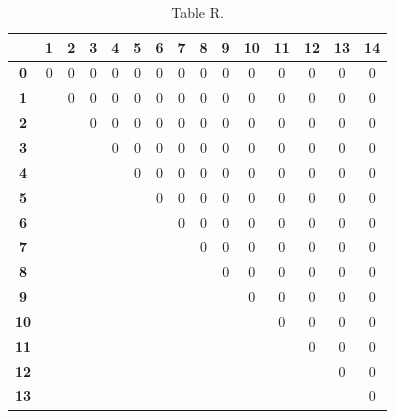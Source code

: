 \documentclass{article}
\begin{document}
\begin{table}[!ht]
\begin{adjustwidth}{-3cm}{-3cm}
\centering
\begin{tabular}{c||c|c|c|c|c|c|c|c|c|c|c|c|c|c|}
\cline{2-15}
 & \cellcolor{gray90}\textbf{1} & \cellcolor{gray90}\textbf{2} & \cellcolor{gray90}\textbf{3} & \cellcolor{gray90}\textbf{4} & \cellcolor{gray90}\textbf{5} & \cellcolor{gray90}\textbf{6} & \cellcolor{gray90}\textbf{7} & \cellcolor{gray90}\textbf{8} & \cellcolor{gray90}\textbf{9} & \cellcolor{gray90}\textbf{10} & \cellcolor{gray90}\textbf{11} & \cellcolor{gray90}\textbf{12} & \cellcolor{gray90}\textbf{13} & \cellcolor{gray90}\textbf{14} \\
\hline\hline
\multicolumn{1}{|c||}{\cellcolor{gray90}\textbf{0}} & 0 & 0 & 0 & 0 & 0 & 0 & 0 & 0 & 0 & 0 & 0 & 0 & 0 & 0 \\ \hline
\multicolumn{1}{|c||}{\cellcolor{gray90}\textbf{1}} &  & 0 & 0 & 0 & 0 & 0 & 0 & 0 & 0 & 0 & 0 & 0 & 0 & 0 \\ \hline
\multicolumn{1}{|c||}{\cellcolor{gray90}\textbf{2}} &  &  & 0 & 0 & 0 & 0 & 0 & 0 & 0 & 0 & 0 & 0 & 0 & 0 \\ \hline
\multicolumn{1}{|c||}{\cellcolor{gray90}\textbf{3}} &  &  &  & 0 & 0 & 0 & 0 & 0 & 0 & 0 & 0 & 0 & 0 & 0 \\ \hline
\multicolumn{1}{|c||}{\cellcolor{gray90}\textbf{4}} &  &  &  &  & 0 & 0 & 0 & 0 & 0 & 0 & 0 & 0 & 0 & 0 \\ \hline
\multicolumn{1}{|c||}{\cellcolor{gray90}\textbf{5}} &  &  &  &  &  & 0 & 0 & 0 & 0 & 0 & 0 & 0 & 0 & 0 \\ \hline
\multicolumn{1}{|c||}{\cellcolor{gray90}\textbf{6}} &  &  &  &  &  &  & 0 & 0 & 0 & 0 & 0 & 0 & 0 & 0 \\ \hline
\multicolumn{1}{|c||}{\cellcolor{gray90}\textbf{7}} &  &  &  &  &  &  &  & 0 & 0 & 0 & 0 & 0 & 0 & 0 \\ \hline
\multicolumn{1}{|c||}{\cellcolor{gray90}\textbf{8}} &  &  &  &  &  &  &  &  & 0 & 0 & 0 & 0 & 0 & 0 \\ \hline
\multicolumn{1}{|c||}{\cellcolor{gray90}\textbf{9}} &  &  &  &  &  &  &  &  &  & 0 & 0 & 0 & 0 & 0 \\ \hline
\multicolumn{1}{|c||}{\cellcolor{gray90}\textbf{10}} &  &  &  &  &  &  &  &  &  &  & 0 & 0 & 0 & 0 \\ \hline
\multicolumn{1}{|c||}{\cellcolor{gray90}\textbf{11}} &  &  &  &  &  &  &  &  &  &  &  & 0 & 0 & 0 \\ \hline
\multicolumn{1}{|c||}{\cellcolor{gray90}\textbf{12}} &  &  &  &  &  &  &  &  &  &  &  &  & 0 & 0 \\ \hline
\multicolumn{1}{|c||}{\cellcolor{gray90}\textbf{13}} &  &  &  &  &  &  &  &  &  &  &  &  &  & 0 \\ \hline
\end{tabular}
\caption{Table R.}
\end{adjustwidth}
\end{table}
\end{document}
